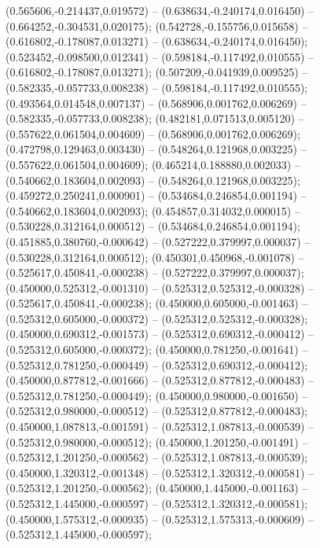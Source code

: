  (0.565606,-0.214437,0.019572) -- (0.638634,-0.240174,0.016450) -- (0.664252,-0.304531,0.020175);
 (0.542728,-0.155756,0.015658) -- (0.616802,-0.178087,0.013271) -- (0.638634,-0.240174,0.016450);
 (0.523452,-0.098500,0.012341) -- (0.598184,-0.117492,0.010555) -- (0.616802,-0.178087,0.013271);
 (0.507209,-0.041939,0.009525) -- (0.582335,-0.057733,0.008238) -- (0.598184,-0.117492,0.010555);
 (0.493564,0.014548,0.007137) -- (0.568906,0.001762,0.006269) -- (0.582335,-0.057733,0.008238);
 (0.482181,0.071513,0.005120) -- (0.557622,0.061504,0.004609) -- (0.568906,0.001762,0.006269);
 (0.472798,0.129463,0.003430) -- (0.548264,0.121968,0.003225) -- (0.557622,0.061504,0.004609);
 (0.465214,0.188880,0.002033) -- (0.540662,0.183604,0.002093) -- (0.548264,0.121968,0.003225);
 (0.459272,0.250241,0.000901) -- (0.534684,0.246854,0.001194) -- (0.540662,0.183604,0.002093);
 (0.454857,0.314032,0.000015) -- (0.530228,0.312164,0.000512) -- (0.534684,0.246854,0.001194);
 (0.451885,0.380760,-0.000642) -- (0.527222,0.379997,0.000037) -- (0.530228,0.312164,0.000512);
 (0.450301,0.450968,-0.001078) -- (0.525617,0.450841,-0.000238) -- (0.527222,0.379997,0.000037);
 (0.450000,0.525312,-0.001310) -- (0.525312,0.525312,-0.000328) -- (0.525617,0.450841,-0.000238);
 (0.450000,0.605000,-0.001463) -- (0.525312,0.605000,-0.000372) -- (0.525312,0.525312,-0.000328);
 (0.450000,0.690312,-0.001573) -- (0.525312,0.690312,-0.000412) -- (0.525312,0.605000,-0.000372);
 (0.450000,0.781250,-0.001641) -- (0.525312,0.781250,-0.000449) -- (0.525312,0.690312,-0.000412);
 (0.450000,0.877812,-0.001666) -- (0.525312,0.877812,-0.000483) -- (0.525312,0.781250,-0.000449);
 (0.450000,0.980000,-0.001650) -- (0.525312,0.980000,-0.000512) -- (0.525312,0.877812,-0.000483);
 (0.450000,1.087813,-0.001591) -- (0.525312,1.087813,-0.000539) -- (0.525312,0.980000,-0.000512);
 (0.450000,1.201250,-0.001491) -- (0.525312,1.201250,-0.000562) -- (0.525312,1.087813,-0.000539);
 (0.450000,1.320312,-0.001348) -- (0.525312,1.320312,-0.000581) -- (0.525312,1.201250,-0.000562);
 (0.450000,1.445000,-0.001163) -- (0.525312,1.445000,-0.000597) -- (0.525312,1.320312,-0.000581);
 (0.450000,1.575312,-0.000935) -- (0.525312,1.575313,-0.000609) -- (0.525312,1.445000,-0.000597);
